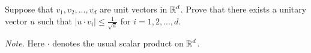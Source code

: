 Suppose that $\displaystyle{{v_1},{v_2},...,{v_d}}$ are unit vectors in $\displaystyle{{{\Bbb R}^d}}$.  Prove that there exists a unitary vector $\displaystyle{u}$ such that $\displaystyle{\left| {u \cdot {v_i}} \right| \leq \frac{1}{{\sqrt d }}}$ for $\displaystyle{i = 1,2,...,d}$.

\textit{Note.} Here $\displaystyle{ \cdot }$ denotes the usual scalar product on $\displaystyle{{{\Bbb R}^d}}$.

